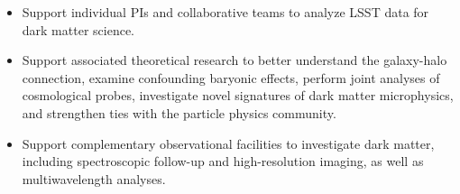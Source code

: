 \documentclass[12pt]{article}
\begin{document}
\begin{itemize}[noitemsep]

    \item Support individual PIs and collaborative teams to analyze LSST data for dark matter science. %
    \item Support associated theoretical research to better understand the galaxy-halo connection, examine confounding baryonic effects, perform joint analyses of cosmological probes, investigate novel signatures of dark matter microphysics, and strengthen ties with the particle physics community. 
    
    \item Support complementary observational facilities to investigate dark matter, including spectroscopic follow-up and high-resolution imaging, as well as multiwavelength analyses.

    
    
    
    
\end{itemize}
\end{document}
